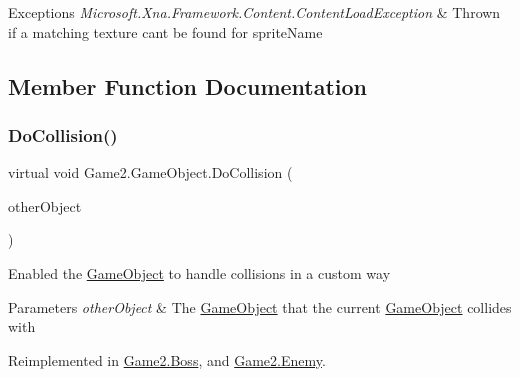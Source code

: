 \begin{DoxyExceptions}{Exceptions}
{\em Microsoft.\+Xna.\+Framework.\+Content.\+Content\+Load\+Exception} & Thrown if a matching texture cant be found for sprite\+Name\\
\hline
\end{DoxyExceptions}


\subsection{Member Function Documentation}
\mbox{\label{class_game2_1_1_game_object_aa811d23c405b9aa28ab922901d0a3002}} 
\subsubsection{\texorpdfstring{Do\+Collision()}{DoCollision()}}
{\footnotesize\ttfamily virtual void Game2.\+Game\+Object.\+Do\+Collision (\begin{DoxyParamCaption}\item[{\mbox{\hyperlink{class_game2_1_1_game_object}{Game\+Object}}}]{other\+Object }\end{DoxyParamCaption})\hspace{0.3cm}{\ttfamily [virtual]}}



Enabled the \mbox{\hyperlink{class_game2_1_1_game_object}{Game\+Object}} to handle collisions in a custom way 


\begin{DoxyParams}{Parameters}
{\em other\+Object} & The \mbox{\hyperlink{class_game2_1_1_game_object}{Game\+Object}} that the current \mbox{\hyperlink{class_game2_1_1_game_object}{Game\+Object}} collides with\\
\hline
\end{DoxyParams}


Reimplemented in \mbox{\hyperlink{class_game2_1_1_boss_a8331b445604b8737664d58bf02f82ce1}{Game2.\+Boss}}, and \mbox{\hyperlink{class_game2_1_1_enemy_a574b0e99f86ce3a5e126484518020dac}{Game2.\+Enemy}}.

\mbox{\label{class_game2_1_1_game_object_ade17d36d8d908594bc434e215052393b}} 
